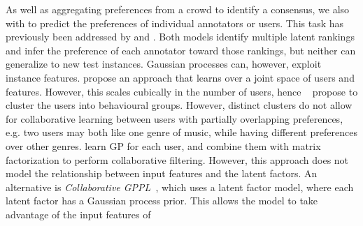 As well as aggregating preferences from a crowd to identify a consensus,
we also with to predict the preferences of individual annotators or users.
This task has previously been addressed by \citet{yi_inferring_2013} and \citet{kim2014latent}.
Both models identify multiple latent rankings and infer 
the preference of each annotator toward those rankings, 
but neither can generalize to new test instances.
Gaussian processes can, however, exploit instance features.
\citet{guo2010gaussian} propose an approach that learns over a 
joint space of users and features. However, this scales cubically
in the number of users, hence ~\citet{abbasnejad2013learning} 
propose to cluster the users into behavioural groups.
However, distinct clusters do not
allow for collaborative learning between users with partially overlapping preferences, e.g. two users may both like one genre of music, 
while having different preferences over other genres. 
\citet{khan2014scalable} learn GP for each user,
and combine them with matrix factorization to perform collaborative filtering.
However, this approach does not model the relationship between
 input features and the latent factors.
An alternative is \emph{Collaborative GPPL}~\citep{houlsby2012collaborative},
which uses a latent factor model, where each latent factor has a Gaussian process prior. 
This allows the model to take advantage of the input features of
